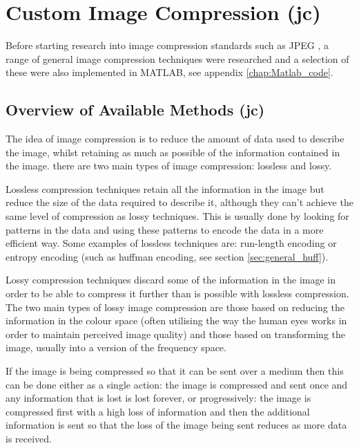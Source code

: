 
\section{Custom Image Compression (jc)}
\label{Custom_comp_research}

Before starting research into image compression standards such as JPEG \cite{exif_std}, a range of general image compression techniques were researched and a selection of these were also implemented in MATLAB, see appendix \ref{chap:Matlab_code}.

\subsection{Overview of Available Methods (jc)}

The idea of image compression is to reduce the amount of data used to describe the image, whilst retaining as much as possible of the information contained in the image. there are two main types of image compression: lossless and lossy.

Lossless compression techniques retain all the information in the image but reduce the size of the data required to describe it, although they can't achieve the same level of compression as lossy techniques. This is usually done by looking for patterns in the data and using these patterns to encode the data in a more efficient way. Some examples of lossless techniques are: run-length encoding or entropy encoding (such as huffman encoding, see section \ref{sec:general_huff}).

Lossy compression techniques discard some of the information in the image in order to be able to compress it further than is possible with lossless compression. The two main types of lossy image compression are those based on reducing the information in the colour space (often utilising the way the human eyes works in order to maintain perceived image quality) and those based on transforming the image, usually into a version of the frequency space.

If the image is being compressed so that it can be sent over a medium then this can be done either as a single action: the image is compressed and sent once and any information that is lost is lost forever, or progressively: the image is compressed first with a high loss of information and then the additional information is sent so that the loss of the image being sent reduces as more data is received.

